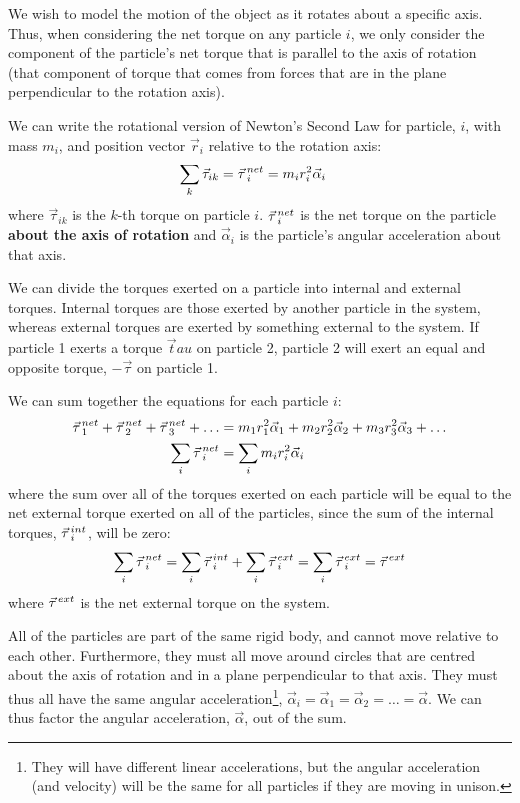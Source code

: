 We wish to model the motion of the object as it rotates about a specific axis. Thus, when considering the net torque on any particle $i$, we only consider the component of the particle's net torque that is parallel to the axis of rotation (that component of torque that comes from forces that are in the plane perpendicular to the rotation axis).

We can write the rotational version of Newton's Second Law for particle, $i$, with mass $m_i$, and position vector $\vec r_i$ relative to the rotation axis:
\begin{align*}
\sum_k \vec\tau_{ik} = \pvec\tau_i^{net} &= m_ir_i^2\vec\alpha_i
\end{align*}
where $\vec\tau_{ik}$ is the $k$-th torque on particle $i$. $\pvec\tau_i^{net}$ is the net torque on the particle \textbf{about the axis of rotation} and $\vec\alpha_i$ is the particle's angular acceleration about that axis.

We can divide the torques exerted on a particle into internal and external torques. Internal torques are those exerted by another particle in the system, whereas external torques are exerted by something external to the system. If particle 1 exerts a torque $\vec tau$ on particle 2, particle 2 will exert an equal and opposite torque, $-\vec\tau$ on particle 1. 

We can sum together the equations for each particle $i$:
\begin{align*}
\pvec\tau_1^{net} + \pvec\tau_2^{net} +\pvec\tau_3^{net} + \dots &= m_1r_1^2\vec\alpha_1 + m_2r_2^2\vec\alpha_2 +m_3r_3^2\vec\alpha_3 +\dots\\
\sum_i \pvec\tau_i^{net} &= \sum_i  m_ir_i^2\vec\alpha_i
\end{align*}
where the sum over all of the torques exerted on each particle will be equal to the net external torque exerted on all of the particles, since the sum of the internal torques, $\pvec\tau_i^{int}$, will be zero:
\begin{align*}
\sum_i \pvec\tau_i^{net} = \sum_i \pvec\tau_i^{int} + \sum_i \pvec\tau_i^{ext} = \sum_i \pvec\tau_i^{ext} = \pvec\tau^{ext}
\end{align*}
where $ \pvec\tau^{ext}$ is the net external torque on the system.

All of the particles are part of the same rigid body, and cannot move relative to each other. Furthermore, they must all move around circles that are centred about the axis of rotation and in a plane perpendicular to that axis. They must thus all have the same angular acceleration\footnote{They will have different linear accelerations, but the angular acceleration (and velocity) will be the same for all particles if they are moving in unison.}, $\vec\alpha_i = \vec \alpha_1 = \vec \alpha_2 =\dots=\vec\alpha$. We can thus factor the angular acceleration, $\vec \alpha$, out of the sum.

